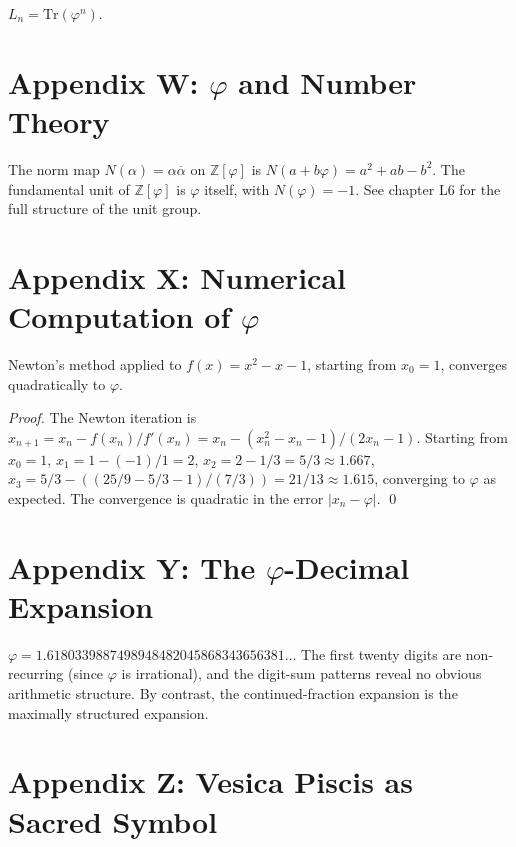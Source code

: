 \begin{corollary}\label{cor:01-lucas-as-trace}
$L_n = \mathrm{Tr}(\varphi^n)$.
\end{corollary}

\section*{Appendix W: $\varphi$ and Number Theory}
\label{sec:01-app-W}

The norm map $N(\alpha) = \alpha \overline{\alpha}$ on
$\mathbb{Z}[\varphi]$ is $N(a + b\varphi) = a^2 + ab - b^2$. The
fundamental unit of $\mathbb{Z}[\varphi]$ is $\varphi$ itself, with
$N(\varphi) = -1$. See chapter L6 for the full structure of the
unit group.

\section*{Appendix X: Numerical Computation of $\varphi$}
\label{sec:01-app-X}

\begin{lemma}
\label{lem:01-newton-phi}
Newton's method applied to $f(x) = x^2 - x - 1$, starting from
$x_0 = 1$, converges quadratically to $\varphi$.
\end{lemma}

\begin{proof}
The Newton iteration is $x_{n+1} = x_n - f(x_n)/f'(x_n) = x_n -
(x_n^2 - x_n - 1)/(2 x_n - 1)$. Starting from $x_0 = 1$,
$x_1 = 1 - (-1)/1 = 2$, $x_2 = 2 - 1/3 = 5/3 \approx 1.667$,
$x_3 = 5/3 - ((25/9 - 5/3 - 1)/(7/3)) = 21/13 \approx 1.615$,
converging to $\varphi$ as expected. The convergence is quadratic
in the error $|x_n - \varphi|$.
\qed
\end{proof}

\section*{Appendix Y: The $\varphi$-Decimal Expansion}
\label{sec:01-app-Y}

$\varphi = 1.6180339887498948482045868343656381\ldots$ The first
twenty digits are non-recurring (since $\varphi$ is irrational), and
the digit-sum patterns reveal no obvious arithmetic structure. By
contrast, the continued-fraction expansion is the maximally
structured expansion.

\section*{Appendix Z: Vesica Piscis as Sacred Symbol}
\label{sec:01-app-Z}

